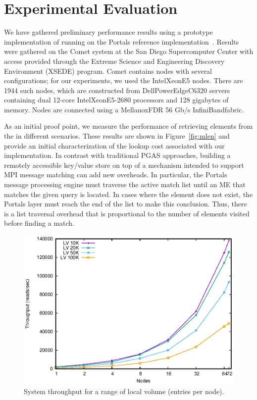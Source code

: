 \section{Experimental Evaluation}
\label{sec:results}

We have gathered preliminary performance results using a prototype
implementation of \pdht running on the Portals reference
implementation~\cite{portals-code}.  Results were gathered on the Comet
system at the San Diego Supercomputer Center with access provided
through the Extreme Science and Engineering Discovery Environment (XSEDE)
program.  Comet contains nodes with several configurations; for our
experiments, we used the Intel\regtm Xeon\regtm E5 nodes.  There are 1944 such
nodes, which are constructed from Dell\othertm PowerEdge\othertm C6320 servers
containing dual 12-core Intel\regtm Xeon\regtm E5-2680 processors and 128
gigabytes of memory.  Nodes are connected using a Mellanox\othertm FDR 56 Gb/s
InfiniBand\othertm fabric.

As an initial proof point, we measure the performance of retrieving elements
from the \pdht in different scenarios.  These results are shown in
Figure~\ref{fig:mlen} and provide an initial characterization of the lookup
cost associated with our \pdht implementation.  In contrast with traditional
PGAS approaches, building a remotely accessible key/value store on top of a
mechanism intended to support MPI message matching can add new overheads.  In
particular, the Portals message processing engine must traverse the active
match list until an ME that matches the given query is located.  In cases where
the element does not exist, the Portals layer must reach the end of the list to
make this conclusion.  Thus, there is a list traversal overhead that is
proportional to the number of elements visited before finding a match.

\begin{figure}
    \centering
    \includegraphics[width=\linewidth]{plots/throughput}
    \caption{System throughput for a range of local volume (entries per node).}
    \label{fig:throughput}
\end{figure}

